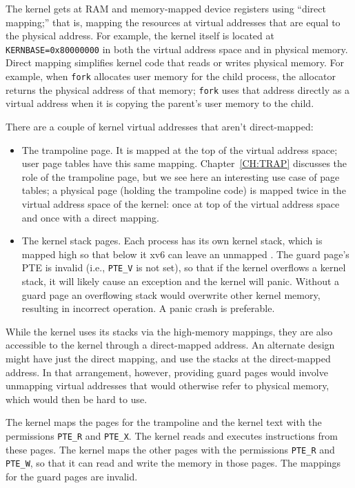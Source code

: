 The kernel gets at RAM and memory-mapped device registers
using ``direct mapping;'' that is, mapping the resources at
virtual addresses that are equal to the physical address.
For
example, the kernel itself is located at \lstinline{KERNBASE=0x80000000} in both
the virtual address space and in physical memory.
Direct mapping simplifies kernel code that reads or writes
physical memory. For example, when \lstinline{fork}
allocates user memory for the child process,
the allocator returns the physical address of that memory;
\lstinline{fork} uses that address directly as a virtual
address when it is copying the parent's user memory to the child.

There are a couple of kernel virtual
addresses that aren't direct-mapped:

\begin{itemize}
  
\item The trampoline page. It is mapped at the top of the virtual
  address space; user page tables have this same mapping.
  Chapter~\ref{CH:TRAP} discusses the role of the trampoline
  page, but we see here an interesting use case of page tables; a
  physical page (holding the trampoline code) is mapped twice in the
  virtual address space of the kernel: once at top of the virtual
  address space and once with a direct mapping.

\item The kernel stack pages.  Each process has its own kernel stack,
  which is mapped high so that below it xv6 can leave an unmapped .  The guard page's PTE is invalid (i.e.,
  \lstinline{PTE_V} is not set), so that if the kernel overflows
  a kernel stack, it will likely cause an exception and the kernel will panic.
  Without a guard page an overflowing stack would overwrite other kernel memory,
  resulting in incorrect operation. A panic crash is preferable.

\end{itemize}

While the kernel uses its stacks via the high-memory mappings, they
are also accessible to the kernel through a direct-mapped address. An
alternate design might have just the direct mapping, and use the
stacks at the direct-mapped address. In that arrangement, however,
providing guard pages would involve unmapping virtual addresses that
would otherwise refer to physical memory, which would then be hard to
use.

The kernel maps the pages for the trampoline and the kernel text with
the permissions
\lstinline{PTE_R}
and
\lstinline{PTE_X}.
The kernel reads and executes instructions from these pages.
The kernel maps the other pages with the permissions
\lstinline{PTE_R}
and
\lstinline{PTE_W},
so that it can read and write the memory in those pages.
The mappings for the guard pages are invalid.


